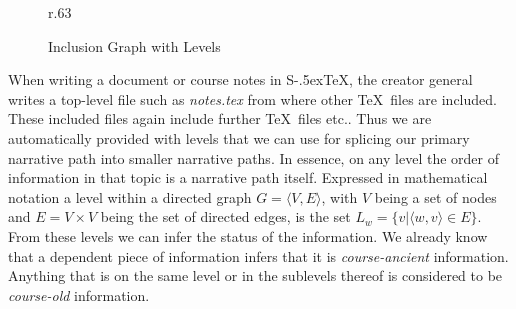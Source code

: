 \documentclass{llncs}
\def\stex{\texorpdfstring{\raisebox{-.5ex}S\kern-.5ex\TeX}{sTeX}\xspace}
\begin{document}
\begin{figure}r{.63\textwidth}\vspace{-2em}
  \vspace{-1em}
  \caption{Inclusion Graph with Levels}\label{fig:levelsGraph}
\vspace{-2em}
\end{figure}
When writing a document or course notes in \stex, the creator general writes a top-level
file such as \textit{notes.tex} from where other \TeX\ files are included. These included
files again include further \TeX\ files etc.. Thus we are automatically provided with
levels that we can use for splicing our primary narrative path into smaller narrative
paths. In essence, on any level the order of information in that topic is a narrative path
itself. Expressed in mathematical notation a level within a directed graph
$G = \langle V, E \rangle $, with $V$ being a set of nodes and $E = V \times V$ being the
set of directed edges, is the set
$L_w = \lbrace v \vert \langle w, v \rangle \in E \rbrace$. From these levels we can infer
the status of the information. We already know that a dependent piece of information
infers that it is \textit{course-ancient} information. Anything that is on the same level
or in the sublevels thereof is considered to be \textit{course-old} information.
\end{document}
